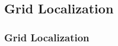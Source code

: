 \documentclass[letterpaper,10pt,english]{sphinxmanual}
\begin{document}
\subsection{Grid Localization}
\label{\detokenize{Localization_index:grid-localization}}
\sphinxstepscope


\subsubsection{Grid Localization}
\label{\detokenize{GridLocalization:grid-localization}}\label{\detokenize{GridLocalization::doc}}
\begin{figure}[htbp]
\centering

\noindent{}
\end{figure}
\end{document}
